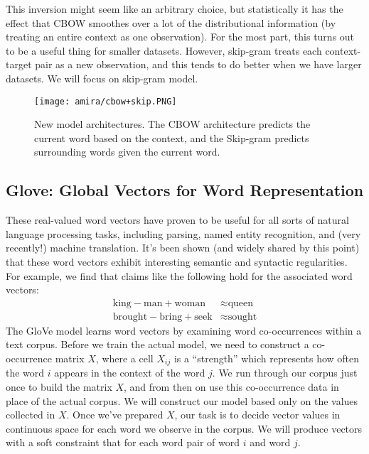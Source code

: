 This inversion might seem like an arbitrary choice, but statistically it has the effect that CBOW smoothes over a lot of the distributional information (by treating an entire context as one observation). For the most part, this turns out to be a useful thing for smaller datasets. However, skip-gram treats each context-target pair as a new observation, and this tends to do better when we have larger datasets. We will focus on skip-gram model.

 \begin{figure}[H]%
     \center%
     \texttt{[image: amira/cbow+skip.PNG]}%
     \caption[cbow and skip Models]{New model architectures. The CBOW architecture predicts the current word based on the context, and the Skip-gram predicts surrounding words given the current word.}\label{fig:cbow}%
 \end{figure}
 \subsection{Glove: Global Vectors for Word Representation}
These real-valued word vectors have proven to be useful for all sorts of natural language processing tasks, including parsing, named entity recognition, and (very recently!) machine translation\cite{pennington2014glove}.
It’s been shown (and widely shared by this point) that these word vectors exhibit interesting semantic and syntactic regularities. For example, we find that claims like the following hold for the associated word vectors:
 \begin{align*}\text{king} - \text{man} + \text{woman} &\approx \text{queen} \\ \text{brought} - \text{bring} + \text{seek} &\approx \text{sought}\end{align*}
 The GloVe model learns word vectors by examining word co-occurrences within a text corpus. Before we train the actual model, we need to construct a co-occurrence matrix $X$, where a cell $X_{ij}$ is a “strength” which represents how often the word $i$ appears in the context of the word $j$. We run through our corpus just once to build the matrix $X$, and from then on use this co-occurrence data in place of the actual corpus. We will construct our model based only on the values collected in $X$.
Once we’ve prepared $X$, our task is to decide vector values in continuous space for each word we observe in the corpus. We will produce vectors with a soft constraint that for each word pair of word $i$ and word $j$.

